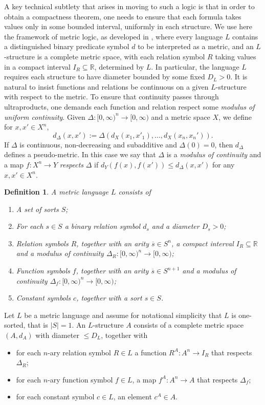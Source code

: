 \documentclass[12pt]{amsart}
\newtheorem{definition}[theorem]{Definition}
\begin{document}
A key technical subtlety that arises in moving to such a logic is that in order to obtain a compactness theorem, one needs to ensure that each formula takes values only in some bounded interval, uniformly in each structure. 
We use here the framework of metric logic, as developed in \cite{MR2436146}, where every language $L$ contains a distinguished binary predicate symbol $d$ to be interpreted as a metric, and an $L$-structure is a complete metric space, with each relation symbol $R$ taking values in a compact interval $I_R\subseteq\mathbb R$, determined by $L$.
In particular, the language $L$ requires each structure to have diameter bounded by some fixed $D_L>0$. It is natural to insist functions and relations be continuous on a given $L$-structure with respect to the metric. 
To ensure that continuity passes through ultraproducts, one demands each function and relation respect some \textit{modulus of uniform continuity}. Given $\Delta \colon [0,\infty)^n\to[0,\infty)$ and a metric space $X$, we define for $x,x'\in X^n$,
\[d_\Delta(x,x'):=\Delta(d_X(x_1,x'_1),\dots,d_X(x_n,x_n')).\]
If $\Delta$ is continuous, non-decreasing and subadditive and $\Delta(0)=0$, then $d_\Delta$ defines a pseudo-metric.
In this case we say that $\Delta$ is a \textit{modulus of continuity} and a map $f \colon X^n\to Y$ \textit{respects} $\Delta$ if $d_Y(f(x),f(x'))\leq d_\Delta(x,x')$ for any $x,x'\in X^n$.

\begin{definition}\label{definition: metric language}
    A metric language $L$ consists of 
    \begin{enumerate}
        \item[(i)] A set of sorts $S$;
        \item[(ii)] For each $s\in S$ a binary relation symbol $d_s$ and a diameter $D_s>0$;
        \item[(iii)] Relation symbols $R$, together with an arity $\overline{s}\in S^n$, a compact interval $I_R\subseteq\mathbb R$ and a modulus of continuity $\Delta_R\colon [0,\infty)^n\to[0,\infty)$;
        \item[(iv)] Function symbols $f$, together with an arity $\overline{s}\in S^{n+1}$ and a modulus of continuity $\Delta_f \colon [0,\infty)^n\to[0,\infty)$;
        \item[(v)] Constant symbols $c$, together with a sort $s\in S$. 
    \end{enumerate}
\end{definition}

Let $L$ be a metric language and assume for notational simplicity that $L$ is one-sorted, that is $|S|=1$.
An $L$-structure ${A}$ consists of a complete metric space $(A,d_A)$ with diameter $\leq D_L$, together with
\begin{itemize}
    \item for each $n$-ary relation symbol $R\in L$ a function $R^A\colon A^{n}\to I_R$ that respects $\Delta_R$;
    \item for each $n$-ary function symbol $f\in L$, a map $f^A\colon A^{n}\to A$ that respects $\Delta_f$;
    \item for each constant symbol $c\in L$, an element $c^A\in A$.
\end{itemize}
\end{document}
